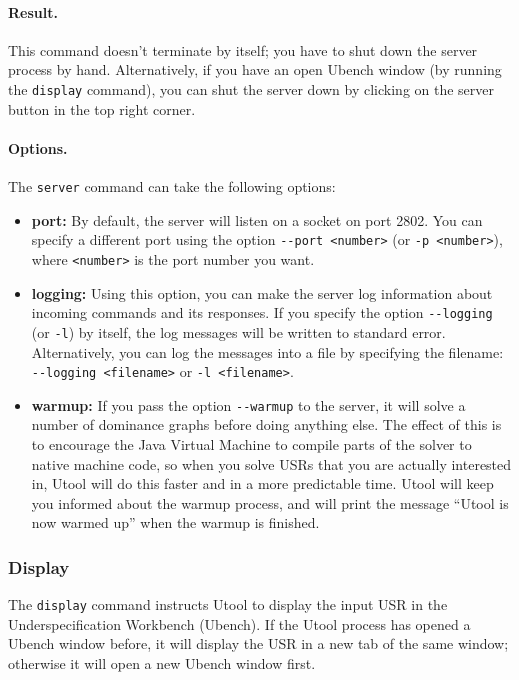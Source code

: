 \paragraph{Result.} This command doesn't terminate by itself; you have
to shut down the server process by hand. Alternatively, if you have an open Ubench window (by running the \verb?display? command), you can shut the server down by clicking on the server button in the top right corner.

\paragraph{Options.} The \verb?server? command can take the following
options:

\begin{itemize}
\item \textbf{port:} By default, the server will listen on a socket on port
2802. You can specify a different port using the option
\verb?--port <number>? (or \verb?-p <number>?), where \verb?<number>?
is the port number you want.

\item \textbf{logging:} Using this option, you can make the server log
information about incoming commands and its responses. If you specify
the option \verb?--logging? (or \verb?-l?) by itself, the log messages
will be written to standard error. Alternatively, you can log the
messages into a file by specifying the filename:
\verb?--logging <filename>? or \verb?-l <filename>?.

\item \textbf{warmup:} If you pass the option \verb?--warmup? to the server, it will solve a number of dominance graphs before doing anything else. The effect of this is to encourage the Java Virtual Machine to compile parts of the solver to native machine code, so when you solve USRs that you are actually interested in, Utool will do this faster and in a more predictable time. Utool will keep you informed about the warmup process, and will print the message ``Utool is now warmed up'' when the warmup is finished.
\end{itemize}




\subsubsection{Display}

The \verb?display? command instructs Utool to display the input USR in
the Underspecification Workbench (Ubench). If the Utool process has
opened a Ubench window before, it will display the USR in a new tab of
the same window; otherwise it will open a new Ubench window first.

